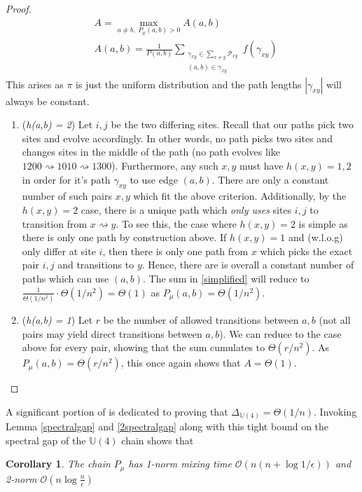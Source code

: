 \documentclass[12pt]{amsart}
\newtheorem{corollary}{Corollary}[theorem]
\theoremstyle{definition}
\theoremstyle{remark}
\numberwithin{equation}{section}
\theoremstyle{remark}
\begin{document}
\begin{proof}
  \begin{align} \label{simplified}
    & A = \max_{a \neq b, \; P_\mu(a,b) > 0} A(a,b) \\
    & A(a,b) = \frac{1}{P(a,b)}\sum_{\substack{\gamma_{xy} \in \sum_{x \neq y}\mathcal{P}_{xy} \\
    (a,b) \in \gamma_{xy}}} f(\gamma_{xy})
  \end{align}
  This arises as $\pi$ is just the uniform distribution and the path lengths $|\gamma_{xy}|$ will always be constant.
  \begin{enumerate}
    \item (\emph{h(a,b) = 2}) Let $i,j$ be the two differing sites. Recall that our paths pick two sites and evolve accordingly. In other words, no path picks two sites and changes sites in the middle of the path (no path evolves like $1200 \rightsquigarrow 1010 \rightsquigarrow 1300$). Furthermore, any such $x,y$ must have $ h(x,y) = 1,2$ in order for it's path $\gamma_{xy}$ to use edge $(a,b)$. There are only a constant number of such pairs $x,y$ which fit the above criterion. Additionally, by the $h(x,y) =2$ case, there is a unique path which \emph{only uses} sites $i,j$ to transition from $x \rightsquigarrow y$. To see this, the case where $h(x,y) = 2$ is simple as there is only one path by construction above. If $h(x,y) = 1$ and (w.l.o.g) only differ at site $i$, then there is only one path from $x$ which picks the exact pair $i,j$ and transitions to $y$. Hence, there are is overall a constant number of paths which can use $(a,b)$. The sum in \ref{simplified} will reduce to $\frac{1}{\Theta(1/n^2)} \cdot \Theta(1/n^2) = \Theta(1)$ as $P_\mu(a,b) = \Theta(1/n^2)$.
    \item (\emph{h(a,b) = 1}) Let $r$ be the number of allowed transitions between $a,b$ (not all pairs may yield direct transitions between $a,b$). We can reduce to the case above for every pair, showing that the sum cumulates to $\Theta(r/n^2)$. As $P_\mu(a,b) = \Theta(r/n^2)$, this once again shows that $A = \Theta(1)$.
  \end{enumerate}
\end{proof}

A significant portion of \cite{harrlow} is dedicated to proving that $\Delta_{\mathbb{U}(4)} = \Theta(1/n)$. Invoking Lemma \ref{spectralgap} and \ref{2spectralgap} along with this tight bound on the spectral gap of the $\mathbb{U}(4)$ chain shows that
%
\begin{corollary}
  The chain $P_\mu$ has 1-norm mixing time $\mathcal{O}(n(n+\log1/\epsilon))$ and 2-norm $\mathcal{O}(n\log\frac{n}{\epsilon})$
\end{corollary}
\end{document}

